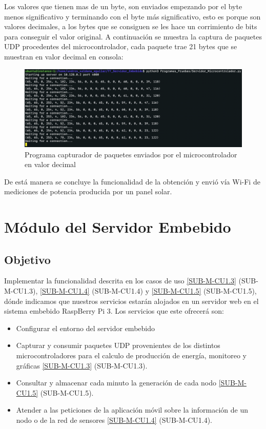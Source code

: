 Los valores que tienen mas de un byte, son enviados empezando por el byte menos significativo y terminando con el byte más significativo, esto es porque son valores decimales, a los bytes que se consiguen se les hace un corrimiento de bits para conseguir el valor original.
A continuación se muestra la captura de paquetes UDP procedentes del microcontrolador, cada paquete trae 21 bytes que se muestran en valor decimal en consola:

\begin{figure}[H]
	\centering
	\includegraphics[scale=.3]{Capitulo5/images/paquetes_recibidos.png}
	\caption{Programa capturador de paquetes enviados por el microcontrolador en valor decimal}
	\label{fig:respuesta sensor}
\end{figure} 


De está manera se concluye la funcionalidad de la obtención y envió vía Wi-Fi de mediciones de potencia producida por un panel solar.

\section{Módulo del Servidor Embebido}

\subsection{Objetivo}
Implementar la funcionalidad descrita en los casos de uso \ref{SUB-M-CU1.3} (SUB-M-CU1.3), \ref{SUB-M-CU1.4} (SUB-M-CU1.4) y \ref{SUB-M-CU1.5} (SUB-M-CU1.5), dónde indicamos que nuestros servicios estarán alojados en un servidor web en el sistema embebido RaspBerry Pi 3. Los servicios que este ofrecerá son:

\begin{itemize}
    \item Configurar el entorno del servidor embebido
    \item Capturar y consumir paquetes UDP provenientes de los distintos microcontroladores para el calculo de producción de energía, monitoreo y gráficas \ref{SUB-M-CU1.3} (SUB-M-CU1.3).
    \item Consultar y almacenar cada minuto la generación de cada nodo \ref{SUB-M-CU1.5} (SUB-M-CU1.5).
    \item Atender a las peticiones de la aplicación móvil sobre la información de un nodo o de la red de sensores \ref{SUB-M-CU1.4} (SUB-M-CU1.4).
\end{itemize}

